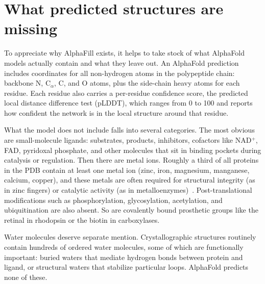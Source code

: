 \section{What predicted structures are missing}
\label{sec:ligand-gap}

To appreciate why AlphaFill exists, it helps to take stock of what AlphaFold models actually contain and what they leave out. An AlphaFold prediction includes coordinates for all non-hydrogen atoms in the polypeptide chain: backbone N, C$_\alpha$, C, and O atoms, plus the side-chain heavy atoms for each residue. Each residue also carries a per-residue confidence score, the predicted local distance difference test (pLDDT), which ranges from 0 to 100 and reports how confident the network is in the local structure around that residue.

What the model does not include falls into several categories. The most obvious are small-molecule ligands: substrates, products, inhibitors, cofactors like NAD$^+$, FAD, pyridoxal phosphate, and other molecules that sit in binding pockets during catalysis or regulation. Then there are metal ions. Roughly a third of all proteins in the PDB contain at least one metal ion (zinc, iron, magnesium, manganese, calcium, copper), and these metals are often required for structural integrity (as in zinc fingers) or catalytic activity (as in metalloenzymes)~\cite{andreini2009}. Post-translational modifications such as phosphorylation, glycosylation, acetylation, and ubiquitination are also absent. So are covalently bound prosthetic groups like the retinal in rhodopsin or the biotin in carboxylases.

Water molecules deserve separate mention. Crystallographic structures routinely contain hundreds of ordered water molecules, some of which are functionally important: buried waters that mediate hydrogen bonds between protein and ligand, or structural waters that stabilize particular loops. AlphaFold predicts none of these.

